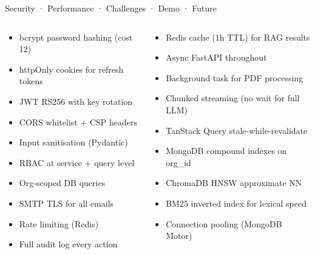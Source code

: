 \documentclass[aspectratio=169,12pt]{beamer}
\begin{document}
\begin{frame}{Security · Performance · Challenges · Demo · Future}
\begin{columns}[T]
  \begin{tcolorbox}[mybox,title={\faShieldAlt\; Security Features}]
    \tiny
    \begin{itemize}
      \item bcrypt password hashing (cost 12)
      \item httpOnly cookies for refresh tokens
      \item JWT RS256 with key rotation
      \item CORS whitelist + CSP headers
      \item Input sanitisation (Pydantic)
      \item RBAC at service + query level
      \item Org-scoped DB queries
      \item SMTP TLS for all emails
      \item Rate limiting (Redis)
      \item Full audit log every action
    \end{itemize}
  \end{tcolorbox}

  \begin{tcolorbox}[mybox,title={\faBolt\; Performance Optimizations}]
    \tiny
    \begin{itemize}
      \item Redis cache (1h TTL) for RAG results
      \item Async FastAPI throughout
      \item Background task for PDF processing
      \item Chunked streaming (no wait for full LLM)
      \item TanStack Query stale-while-revalidate
      \item MongoDB compound indexes on org\_id
      \item ChromaDB HNSW approximate NN
      \item BM25 inverted index for lexical speed
      \item Connection pooling (MongoDB Motor)
    \end{itemize}
  \end{tcolorbox}


\end{columns}
\end{frame}
\end{document}
